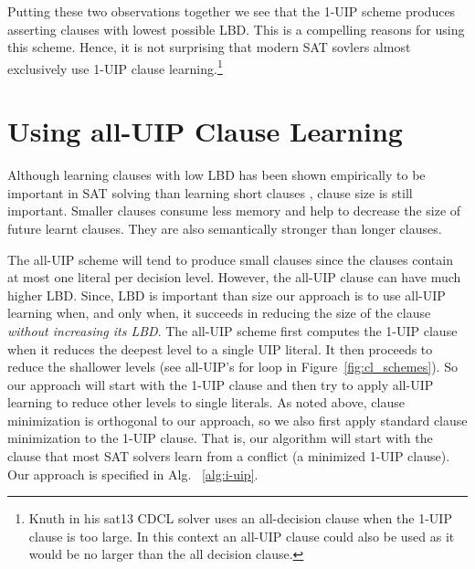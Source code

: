 \documentclass[runningheads]{llncs}
\newcommand{\sat}{SAT\xspace}
\newcommand{\LBD}{\text{LBD}\xspace}
\begin{document}
Putting these two observations together we see that the 1-UIP scheme
produces asserting clauses with lowest possible LBD. This is a
compelling reasons for using this scheme. Hence, it is not surprising
that modern \sat sovlers almost exclusively use 1-UIP clause
learning.\footnote{Knuth in his sat13 CDCL solver \cite{Knuth:Sat13}
  uses an all-decision clause when the 1-UIP clause is too large. In
  this context an all-UIP clause could also be used as it would be no
  larger than the all decision clause.}

\section{Using all-UIP Clause Learning}
\label{sec:i-uip}
Although learning clauses with low LBD has been shown empirically to
be important in \sat solving than learning short clauses
\cite{DBLP:conf/ijcai/AudemardS09}, clause size is still
important. Smaller clauses consume less memory and help to decrease
the size of future learnt clauses. They are also semantically stronger
than longer clauses.

The all-UIP scheme will tend to produce small clauses since the
clauses contain at most one literal per decision level. However, the
all-UIP clause can have much higher LBD. Since, $\LBD$ is important
than size our approach is to use all-UIP learning when, and only when,
it succeeds in reducing the size of the clause \emph{without
  increasing its LBD}. The all-UIP scheme first computes the 1-UIP
clause when it reduces the deepest level to a single UIP literal. It
then proceeds to reduce the shallower levels (see all-UIP's for loop
in Figure~\ref{fig:cl_schemes}). So our approach will start with the
1-UIP clause and then try to apply all-UIP learning to reduce other
levels to single literals. As noted above, clause minimization is
orthogonal to our approach, so we also first apply standard clause
minimization \cite{DBLP:conf/sat/SorenssonB09} to the 1-UIP
clause. That is, our algorithm will start with the clause that most
\sat solvers learn from a conflict (a minimized 1-UIP clause). Our
approach is specified in Alg. ~\ref{alg:i-uip}.
\end{document}
